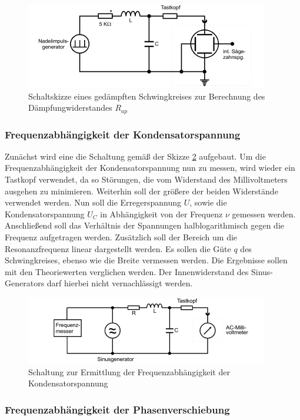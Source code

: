 \begin{figure}[H]
  \centering
  \includegraphics{content/aufgabeB.png}
  \caption{Schaltskizze eines gedämpften Schwingkreises zur Berechnung des Dämpfungwiderstandes $R_{ap}$}
  \label{fig:gsk3}
\end{figure}


\subsubsection{Frequenzabhängigkeit der Kondensatorspannung}

Zunächst wird eine die Schaltung gemäß der Skizze \ref{fig:gsk4} aufgebaut. Um die Frequenzabhängigkeit 
der Kondensatorspannung nun zu messen, wird wieder ein Tastkopf verwendet, da so Störungen, die vom Widerstand
des Millivoltmeters ausgehen zu minimieren. Weiterhin soll der größere der beiden Widerstände verwendet werden.
Nun soll die Erregerspannung $U$, sowie die Kondensatorspannung $U_C$ in Abhängigkeit von der Frequenz $\nu$
gemessen werden. Anschließend soll das Verhältnis der Spannungen halblogarithmisch gegen die Frequenz aufgetragen werden.
Zusätzlich soll der Bereich um die Resonanzfrequenz linear dargestellt werden. Es sollen die Güte $q$ des
Schwingkreises, ebenso wie die Breite vermessen werden. Die Ergebnisse sollen mit den Theoriewerten 
verglichen werden. Der Innenwiderstand des Sinus-Generators darf hierbei nicht vernachlässigt werden.

\begin{figure}[H]
  \centering
  \includegraphics{content/aufgabeC.png}
  \caption{Schaltung zur Ermittlung der Frequenzabhängigkeit der Kondensatorspannung}
  \label{fig:gsk4}
\end{figure}


\subsubsection{Frequenzabhängigkeit der Phasenverschiebung}

